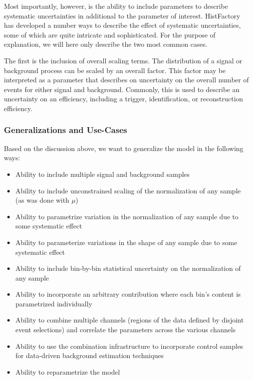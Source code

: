 Most importantly, however, is the ability to include parameters to describe systematic uncertainties in additional to the parameter of interest.
HistFactory has developed a number ways to describe the effect of systematic uncertainties, some of which are quite intricate and sophisticated.
For the purpose of explanation, we will here only describe the two most common cases.

The first is the inclusion of overall scaling terms.
The distribution of a signal or background process can be scaled by an overall factor.
This factor may be interpreted as a parameter that describes on uncertainty on the overall number of events for either signal and background.
Commonly, this is used to describe an uncertainty on an efficiency, including a trigger, identification, or reconstruction efficiency.


\subsubsection{Generalizations and Use-Cases}

Based on the discussion above, we want to generalize the model in the following ways:
\begin{itemize}
	\item Ability to include multiple signal and background samples
	\item Ability to include unconstrained scaling of the normalization of any sample (as was done with $\mu$)
	\item Ability to parametrize variation in the normalization of any sample due to some systematic effect
	\item Ability to parameterize variations in the shape of any sample due to some systematic effect
	\item Ability to include bin-by-bin statistical uncertainty on the normalization of any sample
	\item Ability to incorporate an arbitrary contribution where each bin's content is parametrized individually
	\item Ability to combine multiple channels (regions of the data defined by disjoint event selections) and correlate the parameters across the various channels
	\item Ability to use the combination infrastructure to incorporate control samples for data-driven background estimation techniques
	\item Ability to reparametrize the model 
\end{itemize}

